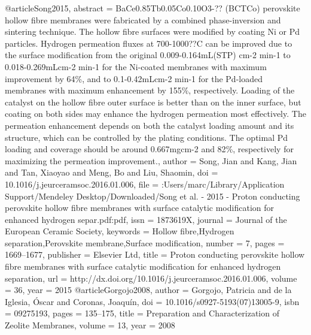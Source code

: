 @article{Song2015,
abstract = {BaCe0.85Tb0.05Co0.10O3-?? (BCTCo) perovskite hollow fibre membranes were fabricated by a combined phase-inversion and sintering technique. The hollow fibre surfaces were modified by coating Ni or Pd particles. Hydrogen permeation fluxes at 700-1000??C can be improved due to the surface modification from the original 0.009-0.164mL(STP) cm-2 min-1 to 0.018-0.269mLcm-2 min-1 for the Ni-coated membranes with maximum improvement by 64{\%}, and to 0.1-0.42mLcm-2 min-1 for the Pd-loaded membranes with maximum enhancement by 155{\%}, respectively. Loading of the catalyst on the hollow fibre outer surface is better than on the inner surface, but coating on both sides may enhance the hydrogen permeation most effectively. The permeation enhancement depends on both the catalyst loading amount and its structure, which can be controlled by the plating conditions. The optimal Pd loading and coverage should be around 0.667mgcm-2 and 82{\%}, respectively for maximizing the permeation improvement.},
author = {Song, Jian and Kang, Jian and Tan, Xiaoyao and Meng, Bo and Liu, Shaomin},
doi = {10.1016/j.jeurceramsoc.2016.01.006},
file = {:Users/marc/Library/Application Support/Mendeley Desktop/Downloaded/Song et al. - 2015 - Proton conducting perovskite hollow fibre membranes with surface catalytic modification for enhanced hydrogen separ.pdf:pdf},
issn = {1873619X},
journal = {Journal of the European Ceramic Society},
keywords = {Hollow fibre,Hydrogen separation,Perovskite membrane,Surface modification},
number = {7},
pages = {1669--1677},
publisher = {Elsevier Ltd},
title = {{Proton conducting perovskite hollow fibre membranes with surface catalytic modification for enhanced hydrogen separation}},
url = {http://dx.doi.org/10.1016/j.jeurceramsoc.2016.01.006},
volume = {36},
year = {2015}
}
@article{Gorgojo2008,
author = {Gorgojo, Patricia and de la Iglesia, {\'{O}}scar and Coronas, Joaqu{\'{i}}n},
doi = {10.1016/s0927-5193(07)13005-9},
isbn = {09275193},
pages = {135--175},
title = {{Preparation and Characterization of Zeolite Membranes}},
volume = {13},
year = {2008}
}
